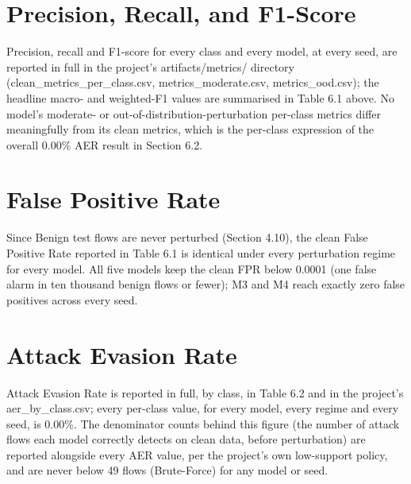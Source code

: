 \documentclass[12pt,a4paper]{report}
\begin{document}
\section{Precision, Recall, and F1-Score}
Precision, recall and F1-score for every class and every model, at every seed, are reported in full in the project's artifacts/metrics/ directory (clean\_metrics\_per\_class.csv, metrics\_moderate.csv, metrics\_ood.csv); the headline macro- and weighted-F1 values are summarised in Table 6.1 above. No model's moderate- or out-of-distribution-perturbation per-class metrics differ meaningfully from its clean metrics, which is the per-class expression of the overall 0.00\% AER result in Section 6.2.

\section{False Positive Rate}
Since Benign test flows are never perturbed (Section 4.10), the clean False Positive Rate reported in Table 6.1 is identical under every perturbation regime for every model. All five models keep the clean FPR below 0.0001 (one false alarm in ten thousand benign flows or fewer); M3 and M4 reach exactly zero false positives across every seed.

\section{Attack Evasion Rate}
Attack Evasion Rate is reported in full, by class, in Table 6.2 and in the project's aer\_by\_class.csv; every per-class value, for every model, every regime and every seed, is 0.00\%. The denominator counts behind this figure (the number of attack flows each model correctly detects on clean data, before perturbation) are reported alongside every AER value, per the project's own low-support policy, and are never below 49 flows (Brute-Force) for any model or seed.
\end{document}
